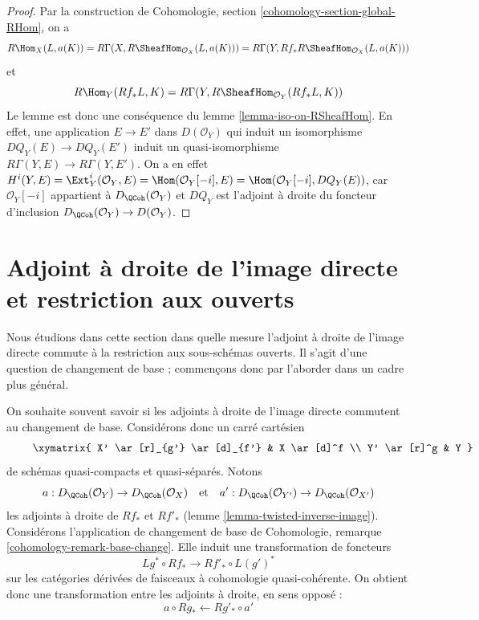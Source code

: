 \begin{proof}
Par la construction de Cohomologie, section \ref{cohomology-section-global-RHom}, on a
$$
R\Hom_X(L, a(K)) =
R\Gamma(X, R\SheafHom_{\mathcal{O}_X}(L, a(K))) =
R\Gamma(Y, Rf_*R\SheafHom_{\mathcal{O}_X}(L, a(K)))
$$
et
$$
R\Hom_Y(Rf_*L, K) = R\Gamma(Y, R\SheafHom_{\mathcal{O}_Y}(Rf_*L, K))
$$
Le lemme est donc une conséquence du lemme \ref{lemma-iso-on-RSheafHom}. En effet, une application $E \to E'$ dans $D(\mathcal{O}_Y)$ qui induit un isomorphisme $DQ_Y(E) \to DQ_Y(E')$ induit un quasi-isomorphisme $R\Gamma(Y, E) \to R\Gamma(Y, E')$. On a en effet $H^i(Y, E) = \Ext^i_Y(\mathcal{O}_Y, E) = \Hom(\mathcal{O}_Y[-i], E) =
\Hom(\mathcal{O}_Y[-i], DQ_Y(E))$, car $\mathcal{O}_Y[-i]$ appartient à $D_\QCoh(\mathcal{O}_Y)$ et $DQ_Y$ est l'adjoint à droite du foncteur d'inclusion $D_\QCoh(\mathcal{O}_Y) \to D(\mathcal{O}_Y)$.
\end{proof}







\section{Adjoint à droite de l'image directe et restriction aux ouverts}
\label{section-restriction-to-opens}

\noindent
Nous étudions dans cette section dans quelle mesure l'adjoint à droite de l'image directe commute à la restriction aux sous-schémas ouverts. Il s'agit d'une question de changement de base ; commençons donc par l'aborder dans un cadre plus général.

\medskip\noindent
On souhaite souvent savoir si les adjoints à droite de l'image directe commutent au changement de base. Considérons donc un carré cartésien
\begin{equation}
\label{equation-base-change}
\vcenter{
\xymatrix{
X' \ar[r]_{g'} \ar[d]_{f'} & X \ar[d]^f \\
Y' \ar[r]^g & Y
}
}
\end{equation}
de schémas quasi-compacts et quasi-séparés. Notons
$$
a  : D_\QCoh(\mathcal{O}_Y) \to D_\QCoh(\mathcal{O}_X)
\quad\text{et}\quad
a'  : D_\QCoh(\mathcal{O}_{Y'}) \to D_\QCoh(\mathcal{O}_{X'})
$$
les adjoints à droite de $Rf_*$ et $Rf'_*$ (lemme \ref{lemma-twisted-inverse-image}). Considérons l'application de changement de base de Cohomologie, remarque \ref{cohomology-remark-base-change}. Elle induit une transformation de foncteurs
$$
Lg^* \circ Rf_* \longrightarrow Rf'_* \circ L(g')^*
$$
sur les catégories dérivées de faisceaux à cohomologie quasi-cohérente. On obtient donc une transformation entre les adjoints à droite, en sens opposé :
$$
a \circ Rg_* \longleftarrow Rg'_* \circ a'
$$


